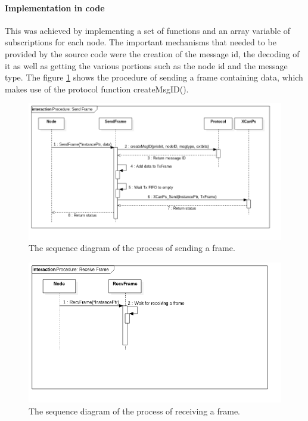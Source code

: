 \paragraph{Implementation in code}
This was achieved by implementing a set of functions and an array variable of subscriptions for each node.
The important mechanisms that needed to be provided by the source code were the creation of the message id, the decoding of it as well as getting the various portions such as the node id and the message type.
The figure \ref{fig:SeqDiagram_SendFrame} shows the procedure of sending a frame containing data, which makes use of the protocol function createMsgID().

\begin{figure}[h!]
	\centering
	\includegraphics[width = 1.2\linewidth]{graphics/seqDiagram_SendFrame.png}
	\caption{The sequence diagram of the process of sending a frame.}
	\label{fig:SeqDiagram_SendFrame}
\end{figure}
\begin{figure}[h!]
	\centering
	\includegraphics[width = 1.2\linewidth]{graphics/seqDiagram_RecvFrame.png}
	\caption{The sequence diagram of the process of receiving a frame.}
	\label{fig:SeqDiagram_RecvFrame}
\end{figure}
